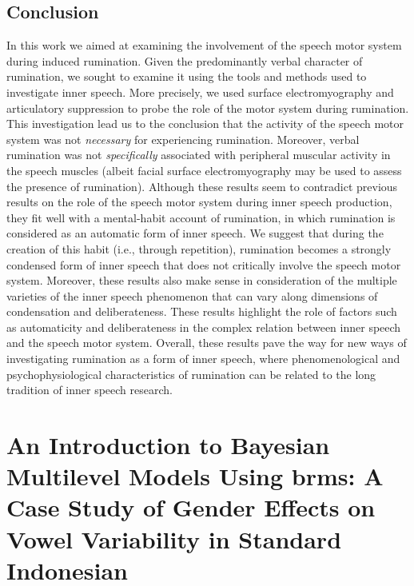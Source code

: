 \documentclass[a4paper,12pt,twoside,openright,oldfontcommands,final]{memoir}
\begin{document}
\hypertarget{conclusion}{%
\section{Conclusion}\label{conclusion}}

In this work we aimed at examining the involvement of the speech motor system during induced rumination. Given the predominantly verbal character of rumination, we sought to examine it using the tools and methods used to investigate inner speech. More precisely, we used surface electromyography and articulatory suppression to probe the role of the motor system during rumination. This investigation lead us to the conclusion that the activity of the speech motor system was not \emph{necessary} for experiencing rumination. Moreover, verbal rumination was not \emph{specifically} associated with peripheral muscular activity in the speech muscles (albeit facial surface electromyography may be used to assess the presence of rumination). Although these results seem to contradict previous results on the role of the speech motor system during inner speech production, they fit well with a mental-habit account of rumination, in which rumination is considered as an automatic form of inner speech. We suggest that during the creation of this habit (i.e., through repetition), rumination becomes a strongly condensed form of inner speech that does not critically involve the speech motor system. Moreover, these results also make sense in consideration of the multiple varieties of the inner speech phenomenon that can vary along dimensions of condensation and deliberateness. These results highlight the role of factors such as automaticity and deliberateness in the complex relation between inner speech and the speech motor system. Overall, these results pave the way for new ways of investigating rumination as a form of inner speech, where phenomenological and psychophysiological characteristics of rumination can be related to the long tradition of inner speech research.

\hypertarget{appendix-appendix}{%
\appendix {}}


\hypertarget{appendix-brms}{%
\chapter{An Introduction to Bayesian Multilevel Models Using brms: A Case Study of Gender Effects on Vowel Variability in Standard Indonesian}\label{appendix-brms}}
\end{document}
